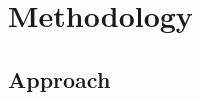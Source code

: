 \chapter{Methodology}
\label{chapter3:Methodology}
\graphicspath{{Chapter-3/graphics/}}

\section{Approach}
\label{chapter3:approach}

\newpage
